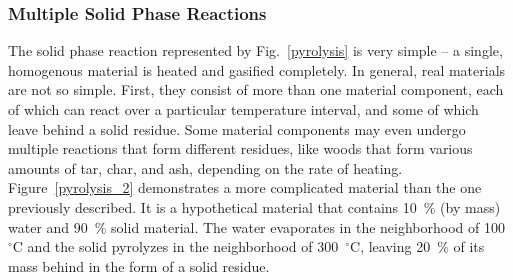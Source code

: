 \documentclass[11pt]{book}
\begin{document}
\subsubsection{Multiple Solid Phase Reactions}

The solid phase reaction represented by Fig.~\ref{pyrolysis} is very simple -- a single, homogenous material is
heated and gasified completely.
In general, real materials are not so simple. First, they consist of more than one material component, each of which can
react over a particular
temperature interval, and some of which leave behind a solid residue.
Some material components may even undergo multiple reactions that
form different residues, like woods that form various amounts of tar, char, and ash, depending on the rate of heating.
Figure~\ref{pyrolysis_2} demonstrates a more complicated material than the one previously described.
It is a hypothetical material that
contains 10~\% (by mass) water and 90~\% solid material. The water evaporates in the neighborhood of 100~$^\circ$C and the
solid pyrolyzes in the
neighborhood of 300~$^\circ$C, leaving 20~\% of its mass behind in the form of a solid residue.
\end{document}
